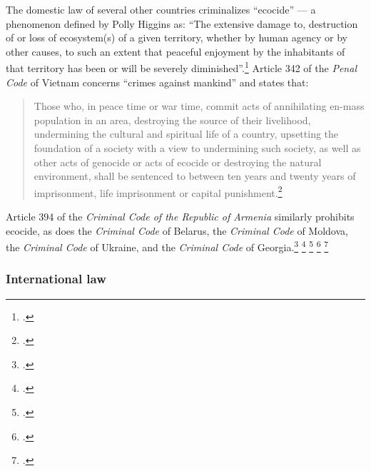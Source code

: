 The domestic law of several other countries criminalizes ``ecocide'' --- a phenomenon defined by Polly Higgins as: ``The extensive damage to, destruction of or loss of ecosystem(s) of a given territory, whether by human agency or by other causes, to such an extent that peaceful enjoyment by the inhabitants of that territory has been or will be severely diminished''.\footcite[][]{EradicatingEcocide}
Article 342 of the \emph{Penal Code} of Vietnam concerns ``crimes against mankind'' and states that:
\begin{quote}
Those who, in peace time or war time, commit acts of annihilating en-mass population in an area, destroying the source of their livelihood, undermining the cultural and spiritual life of a country, upsetting the foundation of a society with a view to undermining such society, as well as other acts of genocide or acts of ecocide or destroying the natural environment, shall be sentenced to between ten years and twenty years of imprisonment, life imprisonment or capital punishment.\footcite[][]{VietnamPenalCode}
\end{quote}
Article 394 of the \emph{Criminal Code of the Republic of Armenia} similarly prohibits ecocide, as does the \emph{Criminal Code} of Belarus, the \emph{Criminal Code} of Moldova, the \emph{Criminal Code} of Ukraine, and the \emph{Criminal Code} of Georgia.\footcite[][]{ArmeniaCriminalCode} \footcite[][]{ICRConBelarusCC} \footcite[][]{MoldovaCriminal} \footcite[][]{UkraineCriminal} \footcite[][]{GeorgiaCriminal}



		\subsubsection{International law}



